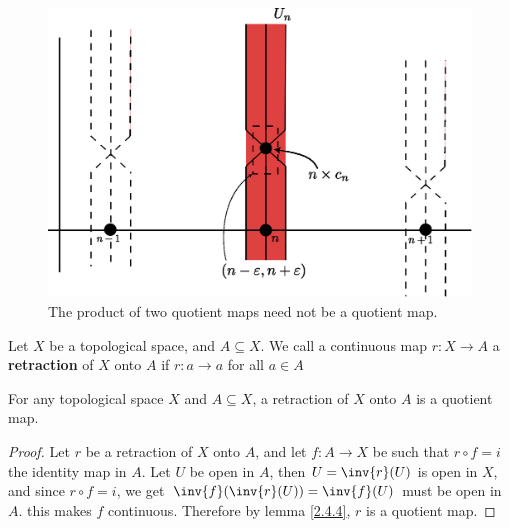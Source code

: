\begin{example}
\begin{enumerate}
            \begin{figure}[h]
                \centering
                \includegraphics[scale=0.5]{Figures/Chapter2/figure22_8.eps}
                \caption{The product of two quotient maps need not be a quotient
                map.}
                \label{fig_2.8}
            \end{figure}
    \end{enumerate}
\end{example}

\begin{definition}
    Let $X$ be a topological space, and  $A \subseteq X$. We call a continuous
    map $r:X \rightarrow A$ a \textbf{retraction} of $X$ onto  $A$ if
    $r:a \rightarrow a$ for all $a \in A$
\end{definition}

\begin{lemma}\label{2.4.8}
    For any topological space $X$ and  $A \subseteq X$, a retraction of  $X$
    onto  $A$ is a quotient map.
\end{lemma}
\begin{proof}
    Let $r$ be a retraction of  $X$ onto  $A$, and let  $f:A \rightarrow X$ be
    such that $r \circ f=i$ the identity map in  $A$. Let  $U$ be open in  $A$,
    then  $U=\inv{r}(U)$ is open in $X$, and since  $r \circ f=i$, we get
    $\inv{f}(\inv{r}(U))=\inv{f}(U)$ must be open in $A$. this makes  $f$
    continuous. Therefore by lemma \ref{2.4.4}, $r$ is a quotient map.
\end{proof}
